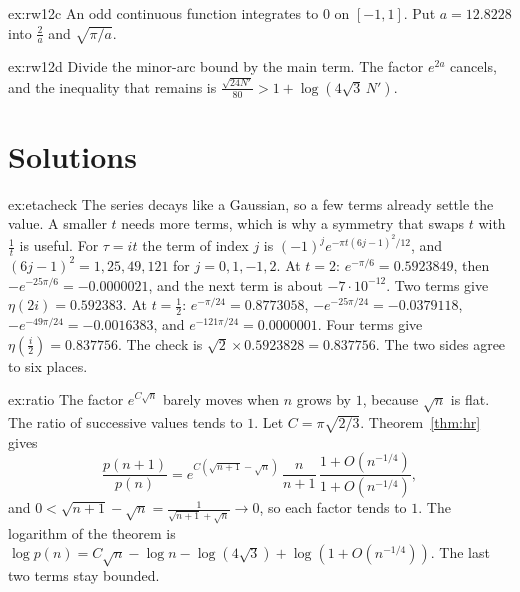 \begin{hint}{ex:rw12c}
An odd continuous function integrates to $0$ on $[-1,1]$. Put $a=12.8228$ into $\frac2a$ and $\sqrt{\pi/a}$.
\end{hint}

\begin{hint}{ex:rw12d}
Divide the minor-arc bound by the main term. The factor $e^{2a}$ cancels, and the inequality that remains is $\frac{\sqrt{24N'}}{80}>1+\log(4\sqrt3\,N')$.
\end{hint}

\section{Solutions}

\begin{solution}{ex:etacheck}
\idea The series decays like a Gaussian, so a few terms already settle the value. A smaller $t$ needs more terms, which is why a symmetry that swaps $t$ with $\frac1t$ is useful.
\writeup For $\tau=it$ the term of index $j$ is $(-1)^je^{-\pi t(6j-1)^2/12}$, and $(6j-1)^2=1,25,49,121$ for $j=0,1,-1,2$.
At $t=2$: $e^{-\pi/6}=0.5923849$, then $-e^{-25\pi/6}=-0.0000021$, and the next term is about $-7\cdot10^{-12}$. Two terms give $\eta(2i)=0.592383$.
At $t=\frac12$: $e^{-\pi/24}=0.8773058$, $-e^{-25\pi/24}=-0.0379118$, $-e^{-49\pi/24}=-0.0016383$, and $e^{-121\pi/24}=0.0000001$. Four terms give $\eta(\frac i2)=0.837756$.
The check is $\sqrt2\times0.5923828=0.837756$. The two sides agree to six places.
\end{solution}

\begin{solution}{ex:ratio}
\idea The factor $e^{C\sqrt n}$ barely moves when $n$ grows by $1$, because $\sqrt n$ is flat. The ratio of successive values tends to $1$.
\writeup Let $C=\pi\sqrt{2/3}$. Theorem~\ref{thm:hr} gives
\[
\frac{p(n+1)}{p(n)}=e^{C(\sqrt{n+1}-\sqrt n)}\,\frac n{n+1}\,\frac{1+O(n^{-1/4})}{1+O(n^{-1/4})},
\]
and $0<\sqrt{n+1}-\sqrt n=\frac1{\sqrt{n+1}+\sqrt n}\to0$, so each factor tends to $1$. The logarithm of the theorem is $\log p(n)=C\sqrt n-\log n-\log(4\sqrt3)+\log(1+O(n^{-1/4}))$. The last two terms stay bounded.
\end{solution}

